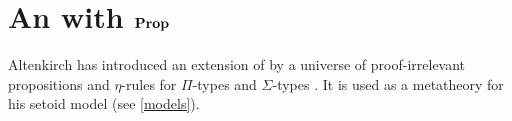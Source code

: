 











\section{An \itt with $\operatorname{\mathbf{Prop}}$}\label{ittprop}

Altenkirch has introduced an extension of \itt by a universe of proof-irrelevant propositions and $\eta$-rules for $\Pi$-types and $\Sigma$-types \cite{alti:lics99}. It is used as a metatheory for his setoid model (see \autoref{models}).

